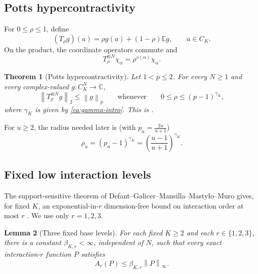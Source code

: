 \documentclass[11pt]{article}
\newtheorem{theorem}{Theorem}[section]
\newtheorem{lemma}[theorem]{Lemma}
\theoremstyle{definition}
\theoremstyle{remark}
\newcommand{\E}{\mathbb{E}}
\newcommand{\C}{\mathbb{C}}
\newcommand{\norm}[1]{\left\lVert #1\right\rVert}
\begin{document}
\subsection{Potts hypercontractivity}

For $0\le\rho\le1$, define
\begin{equation}
\label{eq:potts-noise}
 (T_\rho g)(a)=\rho g(a)+(1-\rho)\E g,
 \qquad a\in C_K.
\end{equation}
On the product, the coordinate operators commute and
\begin{equation}
\label{eq:potts-multiplier}
 T_\rho^{\otimes N}\chi_\alpha
 =\rho^{s(\alpha)}\chi_\alpha.
\end{equation}

\begin{theorem}[Potts hypercontractivity]
\label{thm:potts}
Let $1<p\le2$.  For every $N\ge1$ and every complex-valued
$g:C_K^N\to\C$,
\begin{equation}
\label{eq:potts-hc}
 \norm{T_\rho^{\otimes N}g}_2\le\norm g_p
 \qquad\text{whenever}\qquad
 0\le\rho\le(p-1)^{\gamma_K},
\end{equation}
where $\gamma_K$ is given by \eqref{eq:gamma-intro}.  This is
\cite[Proposition 3.1]{PellegrinoRaposo}.
\end{theorem}

For $u\ge2$, the radius needed later is (with $p_u=\frac{2u}{u+1}$)
\begin{equation}
\label{eq:rho-u}
 \rho_u=(p_u-1)^{\gamma_K}
 =\left(\frac{u-1}{u+1}\right)^{\gamma_K}.
\end{equation}

\subsection{Fixed low interaction levels}

The support-sensitive theorem of
Defant--Galicer--Mansilla--Masty\l o--Muro gives, for fixed $K$, an
exponential-in-$r$ dimension-free bound on interaction order at most $r$
\cite[Theorem 2.13]{DefantEtAlHamming}.  We use only $r=1,2,3$.

\begin{lemma}[Three fixed base levels]
\label{lem:base-levels}
For each fixed $K\ge2$ and each $r\in\{1,2,3\}$, there is a constant
$\beta_{K,r}<\infty$, independent of $N$, such that every exact
interaction-$r$ function $P$ satisfies
\begin{equation}
\label{eq:base-levels}
 A_r(P)\le\beta_{K,r}\norm P_\infty.
\end{equation}
\end{lemma}
\end{document}
